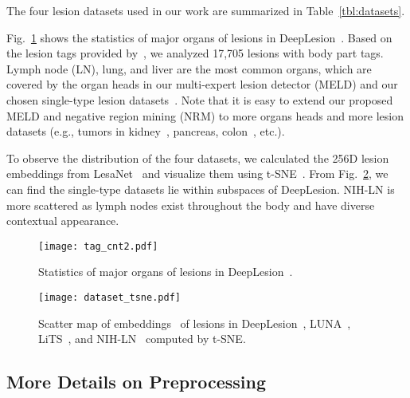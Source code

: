\documentclass[runningheads]{llncs}
\def\Fig#1{{Fig.~\ref{fig:#1}}}
\def\Table#1{{Table~\ref{tbl:#1}}}
\def\eg{{e.g.}}
\begin{document}
The four lesion datasets used in our work are summarized in \Table{datasets}.

\Fig{tag_cnt} shows the statistics of major organs of lesions in DeepLesion~\cite{Yan2018DeepLesion}. Based on the lesion tags provided by~\cite{Yan2019Lesa}, we analyzed 17,705 lesions with body part tags. Lymph node (LN), lung, and liver are the most common organs, which are covered by the organ heads in our multi-expert lesion detector (MELD) and our chosen single-type lesion datasets~\cite{Setio2017LUNA,Bilic2019LiTS,NIH_LN_dataset}. Note that it is easy to extend our proposed MELD and negative region mining (NRM) to more organs heads and more lesion datasets (\eg, tumors in kidney~\cite{KITS_dataset}, pancreas, colon~\cite{simpson2019large}, etc.).

To observe the distribution of the four datasets, we calculated the 256D lesion embeddings from LesaNet~\cite{Yan2019Lesa} and visualize them using t-SNE~\cite{Maaten2014tsne}.  From \Fig{dataset_tsne}, we can find the single-type datasets lie within subspaces of DeepLesion. NIH-LN is more scattered as lymph nodes exist throughout the body and have diverse contextual appearance. 

\begin{figure}[]
	\begin{center}
\texttt{[image: tag\_cnt2.pdf]} \end{center}
	\caption{Statistics of major organs of lesions in DeepLesion~\cite{Yan2019Lesa}.}
	\label{fig:tag_cnt}
\end{figure}

\begin{figure}[]
	\begin{center}
\texttt{[image: dataset\_tsne.pdf]} \end{center}
	\caption{Scatter map of embeddings~\cite{Yan2019Lesa} of lesions in DeepLesion~\cite{Yan2018DeepLesion}, LUNA~\cite{Setio2017LUNA}, LiTS~\cite{Bilic2019LiTS}, and NIH-LN~\cite{NIH_LN_dataset} computed by t-SNE.}
	\label{fig:dataset_tsne}
\end{figure}

\subsection{More Details on Preprocessing}
\label{subsec:impl_detail}
\end{document}
